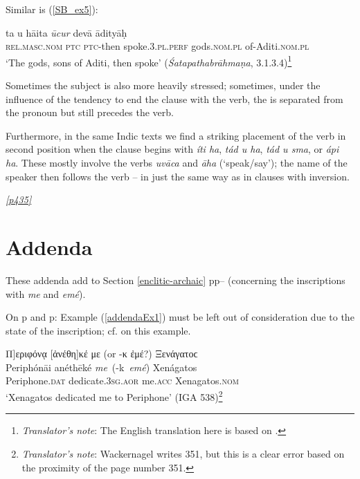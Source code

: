 Similar is (\ref{SB_ex5}):

\begin{exe}
\ex \gll ta u hāita \emph{ūcur} devā ādityāḥ \\
\textsc{rel.masc.nom} \textsc{ptc} \textsc{ptc}-then spoke.\textsc{3.pl.perf} gods.\textsc{nom.pl} of-Aditi.\textsc{nom.pl} \\
\trans `The gods, sons of Aditi, then spoke'
(\textit{Śatapathabrāhmaṇa}, 3.1.3.4)\footnote{\emph{Translator's note}: The English translation here is based on \citet{Eggeling1885}.}
\label{SB_ex5}
\end{exe}

Sometimes the subject is also more heavily stressed; sometimes, under the influence of the tendency to end the clause with the verb, the  is separated from the pronoun but still precedes the verb.

Furthermore, in the same Indic texts we find a striking placement of the verb in second position when the clause begins with \emph{íti ha}, \emph{tád u ha}, \emph{tád u sma}, or \emph{ápi ha}. These mostly involve the verbs \emph{uvāca} and \emph{āha} (`speak/say'); the name of the speaker then follows the verb -- in just the same way as in  clauses with inversion.

\hyperlink{p435}{\emph{[p435]}}


\section*{Addenda}
\noindent These addenda add \hypertarget{addenda}{to} Section \ref{enclitic-archaic} pp\pageref{forAddenda1}--\pageref{forAddenda2} (concerning the inscriptions with \textit{me} and \textit{emé}).

On p\pageref{forAddenda1} and p\pageref{forAddenda2}: Example (\ref{addendaEx1}) must be left out of consideration due to the state of the inscription; cf. \citet[155]{Roehl1882} on this example.

\begin{exe}
\ex {[}Π{]}εριφόνᾳ {[}ἀνέθη{]}κέ με (or -κ ἐμέ?) Ξενάγατοϲ\\
\gll Periphónāi anéthēké \emph{me}~(-k~\emph{emé}) Xenágatos\\
Periphone.\textsc{dat} dedicate.\textsc{3sg.aor} me.\textsc{acc} Xenagatos.\textsc{nom}\\
\trans `Xenagatos dedicated me to Periphone'
(IGA 538)\footnote{\emph{Translator's note}: Wackernagel writes 351, but this is a clear error based on the proximity of the page number 351.}
\label{addendaEx1}
\end{exe}

